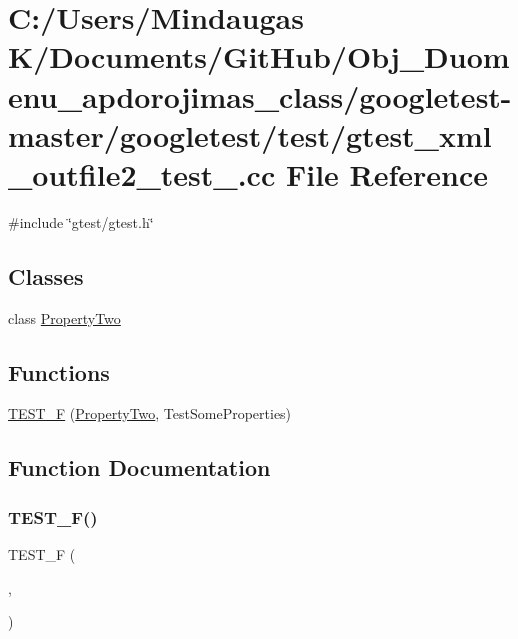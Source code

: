 \hypertarget{googletest-master_2googletest_2test_2gtest__xml__outfile2__test___8cc}{}\section{C\+:/\+Users/\+Mindaugas K/\+Documents/\+Git\+Hub/\+Obj\+\_\+\+Duomenu\+\_\+apdorojimas\+\_\+class/googletest-\/master/googletest/test/gtest\+\_\+xml\+\_\+outfile2\+\_\+test\+\_\+.cc File Reference}
\label{googletest-master_2googletest_2test_2gtest__xml__outfile2__test___8cc}
{\ttfamily \#include \char`\"{}gtest/gtest.\+h\char`\"{}}\newline
\subsection*{Classes}
\begin{DoxyCompactItemize}
\item 
class \mbox{\hyperlink{class_property_two}{Property\+Two}}
\end{DoxyCompactItemize}
\subsection*{Functions}
\begin{DoxyCompactItemize}
\item 
\mbox{\hyperlink{googletest-master_2googletest_2test_2gtest__xml__outfile2__test___8cc_a40b5d77ad85226c30fc3aa4f1e4f7bb5}{T\+E\+S\+T\+\_\+F}} (\mbox{\hyperlink{class_property_two}{Property\+Two}}, Test\+Some\+Properties)
\end{DoxyCompactItemize}


\subsection{Function Documentation}
\mbox{\label{googletest-master_2googletest_2test_2gtest__xml__outfile2__test___8cc_a40b5d77ad85226c30fc3aa4f1e4f7bb5}} 
\subsubsection{\texorpdfstring{TEST\_F()}{TEST\_F()}}
{\footnotesize\ttfamily T\+E\+S\+T\+\_\+F (\begin{DoxyParamCaption}\item[{\mbox{\hyperlink{class_property_two}{Property\+Two}}}]{,  }\item[{Test\+Some\+Properties}]{ }\end{DoxyParamCaption})}

